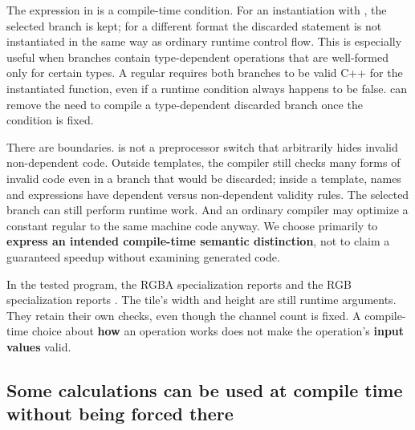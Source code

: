 The expression in  is a compile-time condition. For an instantiation with , the selected branch is kept; for a different format the discarded statement is not instantiated in the same way as ordinary runtime control flow. This is especially useful when branches contain type-dependent operations that are well-formed only for certain types. A regular  requires both branches to be valid C++ for the instantiated function, even if a runtime condition always happens to be false.  can remove the need to compile a type-dependent discarded branch once the condition is fixed.

There are boundaries.  is not a preprocessor switch that arbitrarily hides invalid non-dependent code. Outside templates, the compiler still checks many forms of invalid code even in a branch that would be discarded; inside a template, names and expressions have dependent versus non-dependent validity rules. The selected branch can still perform runtime work. And an ordinary compiler may optimize a constant regular  to the same machine code anyway. We choose  primarily to \textbf{express an intended compile-time semantic distinction}, not to claim a guaranteed speedup without examining generated code.

In the tested program, the RGBA specialization reports  and the RGB specialization reports . The tile's width and height are still runtime arguments. They retain their own checks, even though the channel count is fixed. A compile-time choice about \textbf{how} an operation works does not make the operation's \textbf{input values} valid.

\subsection{Some calculations can be used at compile time without being forced there}\label{05-engine-i-ch005-some-calculations-can-be-used-at-compile-time-without-being-forced-there}

